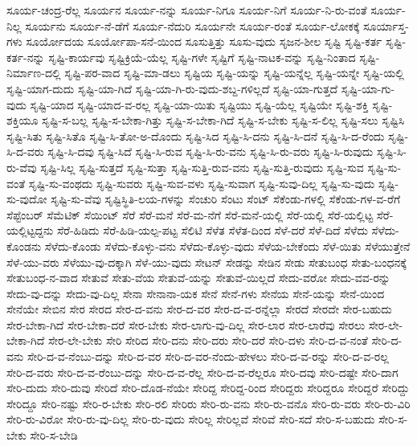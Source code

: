 {ಸೂರ್ಯ-ಚಂದ್ರ-ರೆಲ್ಲ
ಸೂರ್ಯನ
ಸೂರ್ಯ-ನನ್ನು
ಸೂರ್ಯ-ನಿಗೂ
ಸೂರ್ಯ-ನಿಗೆ
ಸೂರ್ಯ-ನಿ-ರು-ವಂತೆ
ಸೂರ್ಯ-ನಿಲ್ಲ
ಸೂರ್ಯನು
ಸೂರ್ಯ-ನೆ-ಡೆಗೆ
ಸೂರ್ಯ-ನೆದುರಿ
ಸೂರ್ಯನೇ
ಸೂರ್ಯ-ರಂತೆ
ಸೂರ್ಯ-ಲೋಕಕ್ಕೆ
ಸೂರ್ಯಾಸ್ತ-ಗಳು
ಸೂರ್ಯೋದಯ
ಸೂರ್ಯೋಪಾ-ಸನೆ-ಯಿಂದ
ಸೂಸುತ್ತಿತ್ತು
ಸೂಸು-ವುದು
ಸೃಜನ-ಶೀಲ
ಸೃಷ್ಟಿ
ಸೃಷ್ಟಿ-ಕರ್ತ
ಸೃಷ್ಟಿ-ಕರ್ತ-ನನ್ನು
ಸೃಷ್ಟಿ-ಕಾರ್ಯವು
ಸೃಷ್ಟಿಕ್ರಿಯೆ-ಯೆಲ್ಲ
ಸೃಷ್ಟಿ-ಗಳೇ
ಸೃಷ್ಟಿಗೆ
ಸೃಷ್ಟಿ-ನಾಟಕ-ವನ್ನು
ಸೃಷ್ಟಿ-ನಿಂತಾದ
ಸೃಷ್ಟಿ-ನಿರ್ಮಾಣ-ದಲ್ಲಿ
ಸೃಷ್ಟಿ-ಪರ-ವಾದ
ಸೃಷ್ಟಿ-ಮಾ-ಡಲು
ಸೃಷ್ಟಿಯ
ಸೃಷ್ಟಿ-ಯನ್ನು
ಸೃಷ್ಟಿ-ಯನ್ನೆಲ್ಲ
ಸೃಷ್ಟಿ-ಯನ್ನೇ
ಸೃಷ್ಟಿ-ಯಲ್ಲಿ
ಸೃಷ್ಟಿ-ಯಾಗ-ದುದು
ಸೃಷ್ಟಿ-ಯಾ-ಗಿದೆ
ಸೃಷ್ಟಿ-ಯಾ-ಗಿ-ರು-ವುದು-ಶಬ್ದ-ಗಳಿಲ್ಲದೆ
ಸೃಷ್ಟಿ-ಯಾ-ಗುತ್ತದೆ
ಸೃಷ್ಟಿ-ಯಾ-ಗು-ವುದು
ಸೃಷ್ಟಿ-ಯಾದ
ಸೃಷ್ಟಿ-ಯಾದ-ವ-ರಲ್ಲ
ಸೃಷ್ಟಿ-ಯಾ-ಯಿತು
ಸೃಷ್ಟಿಯು
ಸೃಷ್ಟಿ-ಯೆಲ್ಲ
ಸೃಷ್ಟಿಯೇ
ಸೃಷ್ಟಿ-ಶಕ್ತಿ
ಸೃಷ್ಟಿ-ಶಕ್ತಿಯೂ
ಸೃಷ್ಟಿ-ಸ-ಬಲ್ಲ
ಸೃಷ್ಟಿ-ಸ-ಬೇಕಾ-ಗಿತ್ತು
ಸೃಷ್ಟಿ-ಸ-ಬೇಕಾ-ಗಿದೆ
ಸೃಷ್ಟಿ-ಸ-ಬೇಕು
ಸೃಷ್ಟಿ-ಸ-ಲಿಲ್ಲ
ಸೃಷ್ಟಿ-ಸಲು
ಸೃಷ್ಟಿಸಿ
ಸೃಷ್ಟಿ-ಸಿತು
ಸೃಷ್ಟಿ-ಸಿತೊ
ಸೃಷ್ಟಿ-ಸಿ-ತೋ-ಅ-ದೊಂದು
ಸೃಷ್ಟಿ-ಸಿದ
ಸೃಷ್ಟಿ-ಸಿ-ದನು
ಸೃಷ್ಟಿ-ಸಿ-ದನೆ
ಸೃಷ್ಟಿ-ಸಿ-ದ-ರೆಂದು
ಸೃಷ್ಟಿ-ಸಿ-ದ-ವರು
ಸೃಷ್ಟಿ-ಸಿ-ದವು
ಸೃಷ್ಟಿ-ಸಿದೆ
ಸೃಷ್ಟಿ-ಸಿ-ರುವ
ಸೃಷ್ಟಿ-ಸಿ-ರು-ವನು
ಸೃಷ್ಟಿ-ಸಿ-ರು-ವರು
ಸೃಷ್ಟಿ-ಸಿ-ರುವುದು
ಸೃಷ್ಟಿ-ಸಿ-ರು-ವೆವು
ಸೃಷ್ಟಿ-ಸಿಲ್ಲ
ಸೃಷ್ಟಿ-ಸುತ್ತದೆ
ಸೃಷ್ಟಿ-ಸುತ್ತಾ
ಸೃಷ್ಟಿ-ಸುತ್ತಿ-ರುವ-ವನು
ಸೃಷ್ಟಿ-ಸುತ್ತಿ-ರುವುದು
ಸೃಷ್ಟಿ-ಸುವ
ಸೃಷ್ಟಿ-ಸು-ವಂತೆ
ಸೃಷ್ಟಿ-ಸು-ವಂಥದು
ಸೃಷ್ಟಿ-ಸುವರು
ಸೃಷ್ಟಿ-ಸುವ-ವಳು
ಸೃಷ್ಟಿ-ಸುವಾಗ
ಸೃಷ್ಟಿ-ಸುವು-ದಿಲ್ಲ
ಸೃಷ್ಟಿ-ಸು-ವುದು
ಸೃಷ್ಟಿ-ಸು-ವುದೋ
ಸೃಷ್ಟಿ-ಸು-ವೆವು
ಸೃಷ್ಟಿಸ್ಥಿತಿ-ಲಯ-ಗಳನ್ನು
ಸೆಂಚುರಿ
ಸೆಂಟು
ಸೆಂಟ್
ಸೆಕೆಂಡು-ಗಳಲ್ಲಿ
ಸೆಕೆಂಡು-ಗಳ-ವ-ರೆಗೆ
ಸೆಪ್ಟೆಂಬರ್
ಸೆಮೆಟಿಕ್
ಸೆಯಿಂಟ್
ಸೆರೆ
ಸೆರೆ-ಮನೆ
ಸೆರೆ-ಮ-ನೆಗೆ
ಸೆರೆ-ಮನೆ-ಯಲ್ಲಿ
ಸೆರೆ-ಯಲ್ಲಿ
ಸೆರೆ-ಯಲ್ಲಿಟ್ಟ
ಸೆರೆ-ಯಲ್ಲಿಟ್ಟದ್ದನು
ಸೆರೆ-ಹಿಡಿದು
ಸೆರೆ-ಹಿಡಿ-ಯಲ್ಪ-ಪಟ್ಟ
ಸೆಲಿಟಿ
ಸೆಳೆತ
ಸೆಳೆತ-ದಿಂದ
ಸೆಳೆ-ದರೆ
ಸೆಳೆ-ದಿದೆ
ಸೆಳೆದು
ಸೆಳೆದು-ಕೊಂಡನು
ಸೆಳೆದು-ಕೊಂಡು
ಸೆಳೆದು-ಕೊಳ್ಳು-ವನು
ಸೆಳೆದು-ಕೊಳ್ಳು-ವುದು
ಸೆಳೆಯ-ಬೇಕೆಂದು
ಸೆಳೆ-ಯಿತು
ಸೆಳೆಯುತ್ತೇನೆ
ಸೆಳೆ-ಯು-ವರು
ಸೆಳೆಯು-ವು-ದಕ್ಕಾಗಿ
ಸೆಳೆ-ಯು-ವುದು
ಸೇಟನ್
ಸೇಡನ್ನು
ಸೇಡಿನ
ಸೇಡು
ಸೇತುಬಂಧ
ಸೇತು-ಬಂಧನಕ್ಕೆ
ಸೇತುಬಂಧ-ನ-ವಾದ
ಸೇತುವೆ
ಸೇತು-ವೆಯ
ಸೇತುವೆ-ಯನ್ನು
ಸೇತುವೆ-ಯಿಲ್ಲದೆ
ಸೇದು-ವರೋ
ಸೇದು-ವವ-ರನ್ನು
ಸೇದು-ವು-ದನ್ನು
ಸೇದು-ವು-ದಿಲ್ಲ
ಸೇನಾ
ಸೇನಾನಾ-ಯಕ
ಸೇನೆ
ಸೇನೆ-ಗಳು
ಸೇನೆಯ
ಸೇನೆ-ಯನ್ನು
ಸೇನೆ-ಯಿಂದ
ಸೇನೆಯೇ
ಸೇಬಿನ
ಸೇರ
ಸೇರದ
ಸೇರ-ದ-ವನು
ಸೇರ-ದ-ವರ
ಸೇರ-ದ-ವ-ರನ್ನೆಲ್ಲಾ
ಸೇರದೆ
ಸೇರದೇ
ಸೇರ-ಬಹುದು
ಸೇರ-ಬೇಕಾ-ಗಿದೆ
ಸೇರ-ಬೇಕಾ-ದರೆ
ಸೇರ-ಬೇಕು
ಸೇರ-ಲಾಗು-ವು-ದಿಲ್ಲ
ಸೇರ-ಲಾರ
ಸೇರ-ಲಾರೆವು
ಸೇರಲು
ಸೇರ-ಲೇ-ಬೇಕಾ-ಗಿದೆ
ಸೇರ-ಲೇ-ಬೇಕು
ಸೇರಿ
ಸೇರಿದ
ಸೇರಿ-ದನು
ಸೇರಿ-ದರು
ಸೇರಿ-ದರೆ
ಸೇರಿ-ದಳು
ಸೇರಿ-ದ-ವ-ನಂತೆ
ಸೇರಿ-ದ-ವನು
ಸೇರಿ-ದ-ವ-ನೆಂಬು-ದನ್ನು
ಸೇರಿ-ದ-ವರ
ಸೇರಿ-ದ-ವರ-ನೆಂದು-ಹೇಳಲು
ಸೇರಿ-ದ-ವ-ರನ್ನು
ಸೇರಿ-ದ-ವ-ರಲ್ಲ
ಸೇರಿ-ದ-ವರು
ಸೇರಿ-ದ-ವ-ರೆಂಬು-ದನ್ನು
ಸೇರಿ-ದ-ವ-ರೆಲ್ಲ
ಸೇರಿ-ದ-ವ-ರೆಲ್ಲರೂ
ಸೇರಿ-ದವು
ಸೇರಿ-ದಷ್ಟೇ
ಸೇರಿ-ದಾಗ
ಸೇರಿ-ದುದು
ಸೇರಿ-ದುವು
ಸೇರಿದೆ
ಸೇರಿ-ದೊಡ-ನೆಯೇ
ಸೇರಿದ್ದ
ಸೇರಿದ್ದ-ರಿಂದ
ಸೇರಿದ್ದರು
ಸೇರಿದ್ದರೂ
ಸೇರಿದ್ದರೆ
ಸೇರಿದ್ದು
ಸೇರಿದ್ದೂ
ಸೇರಿ-ನಷ್ಟು
ಸೇರಿ-ರ-ಬೇಕು
ಸೇರಿ-ರಲಿ
ಸೇರಿರು
ಸೇರಿ-ರು-ವನು
ಸೇರಿ-ರು-ವನೊ
ಸೇರಿ-ರು-ವರು
ಸೇರಿ-ರು-ವಿರಿ
ಸೇರಿ-ರು-ವಿರೋ
ಸೇರಿ-ರು-ವು-ದಿಲ್ಲ
ಸೇರಿ-ರು-ವುದು
ಸೇರಿಲ್ಲ
ಸೇರಿಲ್ಲವೆ
ಸೇರಿವೆ
ಸೇರಿ-ಸದೆ
ಸೇರಿ-ಸ-ಬಹುದು
ಸೇರಿ-ಸ-ಬೇಕು
ಸೇರಿ-ಸ-ಬೇಡಿ
}
